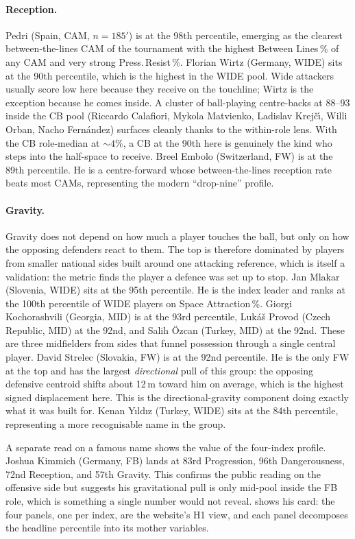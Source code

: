 \documentclass[12pt,a4paper]{article}
\begin{document}
\paragraph{Reception.}
Pedri (Spain, CAM, $n=185'$) is at the 98th percentile, emerging as the clearest between-the-lines CAM of the tournament with the highest Between Lines\,\% of any CAM and very strong Press.\,Resist\,\%.
Florian Wirtz (Germany, WIDE) sits at the 90th percentile, which is the highest in the WIDE pool. Wide attackers usually score low here because they receive on the touchline; Wirtz is the exception because he comes inside.
A cluster of ball-playing centre-backs at 88--93 inside the CB pool (Riccardo Calafiori, Mykola Matvienko, Ladislav Krej\v{c}\'{\i}, Willi Orban, Nacho Fern\'{a}ndez) surfaces cleanly thanks to the within-role lens. With the CB role-median at ${\sim}4\%$, a CB at the 90th here is genuinely the kind who steps into the half-space to receive.
Breel Embolo (Switzerland, FW) is at the 89th percentile. He is a centre-forward whose between-the-lines reception rate beats most CAMs, representing the modern ``drop-nine'' profile.

\paragraph{Gravity.}
Gravity does not depend on how much a player touches the ball, but only on how the opposing defenders react to them.
The top is therefore dominated by players from smaller national sides built around one attacking reference, which is itself a validation: the metric finds the player a defence was set up to stop.
Jan Mlakar (Slovenia, WIDE) sits at the 95th percentile. He is the index leader and ranks at the 100th percentile of WIDE players on Space Attraction\,\%.
Giorgi Kochorashvili (Georgia, MID) is at the 93rd percentile, Luk\'{a}\v{s} Provod (Czech Republic, MID) at the 92nd, and Salih \"{O}zcan (Turkey, MID) at the 92nd. These are three midfielders from sides that funnel possession through a single central player.
David Strelec (Slovakia, FW) is at the 92nd percentile. He is the only FW at the top and has the largest \emph{directional} pull of this group: the opposing defensive centroid shifts about 12\,m toward him on average, which is the highest signed displacement here. This is the directional-gravity component doing exactly what it was built for.
Kenan Y\i{}ld\i{}z (Turkey, WIDE) sits at the 84th percentile, representing a more recognisable name in the group.

A separate read on a famous name shows the value of the four-index profile. Joshua Kimmich (Germany, FB) lands at 83rd Progression, 96th Dangerousness, 72nd Reception, and 57th Gravity. This confirms the public reading on the offensive side but suggests his gravitational pull is only mid-pool inside the FB role, which is something a single number would not reveal.
 shows his card: the four panels, one per index, are the website's H1 view, and each panel decomposes the headline percentile into its mother variables.
\end{document}
